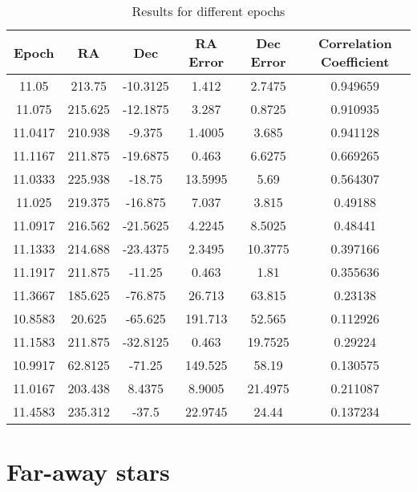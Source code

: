 \begin{table}[h!]
	\centering
	\def\arraystretch{1.2}
	\begin{tabular}{|c c c c c c|} 
		\hline
		\textbf{Epoch} & RA & Dec & RA Error & Dec Error & Correlation Coefficient \\ [0.5ex] 
		\hline\hline
		11.05 & 213.75 & -10.3125 & 1.412 & 2.7475 & 0.949659 \\ 
		\hline
		11.075 & 215.625 & -12.1875 & 3.287 & 0.8725 & 0.910935 \\ 
		\hline
		11.0417 & 210.938 & -9.375 & 1.4005 & 3.685 & 0.941128 \\ 
		\hline
		11.1167 & 211.875 & -19.6875 & 0.463 & 6.6275 & 0.669265 \\ 
		\hline
		11.0333 & 225.938 & -18.75 & 13.5995 & 5.69 & 0.564307 \\ 
		\hline
		11.025 & 219.375 & -16.875 & 7.037 & 3.815 & 0.49188 \\ 
		\hline
		11.0917 & 216.562 & -21.5625 & 4.2245 & 8.5025 & 0.48441 \\ 
		\hline
		11.1333 & 214.688 & -23.4375 & 2.3495 & 10.3775 & 0.397166 \\ 
		\hline
		11.1917 & 211.875 & -11.25 & 0.463 & 1.81 & 0.355636 \\ 
		\hline
		11.3667 & 185.625 & -76.875 & 26.713 & 63.815 & 0.23138 \\ 
		\hline
		10.8583 & 20.625 & -65.625 & 191.713 & 52.565 & 0.112926 \\ 
		\hline
		11.1583 & 211.875 & -32.8125 & 0.463 & 19.7525 & 0.29224 \\ 
		\hline
		10.9917 & 62.8125 & -71.25 & 149.525 & 58.19 & 0.130575 \\ 
		\hline
		11.0167 & 203.438 & 8.4375 & 8.9005 & 21.4975 & 0.211087 \\ 
		\hline
		11.4583 & 235.312 & -37.5 & 22.9745 & 24.44 & 0.137234 \\
		\hline
	\end{tabular}
	\caption{Results for different epochs}
\end{table}




\section{Far-away stars}


